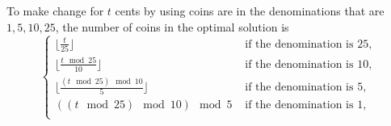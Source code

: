 \begin{claim}
    To make change for $t$ cents by using coins are in the denominations that are $1, 5, 10, 25$, 
    the number of coins in the optimal solution is 
    \begin{equation*}
        \begin{cases}
            \lfloor \frac{t}{25} \rfloor 
                & \text{ if the denomination is $25$, } \\
            \lfloor \frac{t \mod 25}{10} \rfloor 
                & \text{ if the denomination is $10$, } \\
            \lfloor \frac{(t \mod 25) \mod 10}{5} \rfloor 
                & \text{ if the denomination is $5$, } \\
            ((t \mod 25) \mod 10) \mod 5
                & \text{ if the denomination is $1$, } \\
            \end{cases}
    \end{equation*}
\end{claim}

